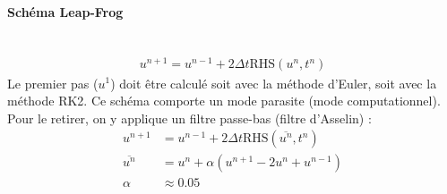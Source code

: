 \paragraph{Schéma Leap-Frog}~\\
\begin{align}
	u^{n+1} = u^{n-1}+2\Delta t \mathrm{RHS}(u^n, t^n)
\end{align}
Le premier pas ($u^1$) doit être calculé soit avec la méthode d'Euler, soit avec la méthode RK2. Ce schéma comporte un mode parasite (mode computationnel). Pour le retirer, on y applique un filtre passe-bas (filtre d'Asselin) : 
\begin{align}
	u^{n+1} &= u^{n-1}+2\Delta t \mathrm{RHS}(\overline{u^n}, t^n)\\
	\overline{u^n} &= u^{n} + \alpha(u^{n+1}-2u^n+u^{n-1})\\
	\alpha &\approx 0.05
\end{align}
